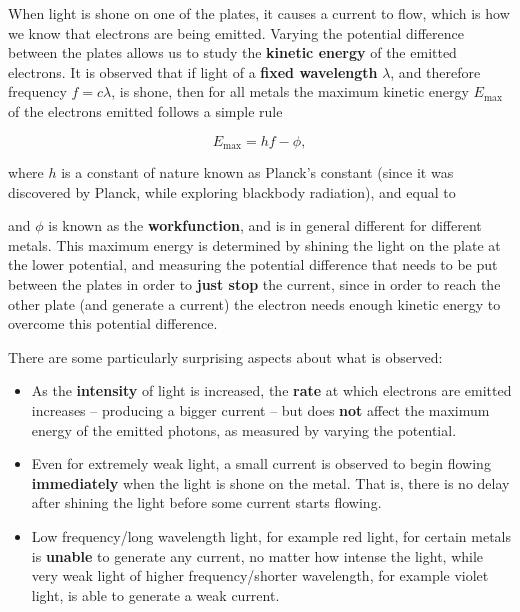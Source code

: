 \documentclass[9pt,Preprint]{lapreprint}
\begin{document}
When light is shone on one of the plates, it causes a current to flow, which is how we know that electrons are being emitted. Varying the potential difference between the plates allows us to study the \textbf{kinetic energy} of the emitted electrons. It is observed that if light of a \textbf{fixed wavelength} $\lambda$, and therefore frequency $f = c\lambda$, is shone, then for all metals the maximum kinetic energy $E_\mathrm{max}$ of the electrons emitted follows a simple rule

\begin{equation}
E_\mathrm{max} = h f - \phi,
\end{equation}

where $h$ is a constant of nature known as Planck's constant (since it was discovered by Planck, while exploring blackbody radiation), and equal to

and $\phi$ is known as the \textbf{workfunction}, and is in general different for different metals. This maximum energy is determined by shining the light on the plate at the lower potential, and measuring the potential difference that needs to be put between the plates in order to \textbf{just stop} the current, since in order to reach the other plate (and generate a current) the electron needs enough kinetic energy to overcome this potential difference.

There are some particularly surprising aspects about what is observed:

\begin{itemize}
\item As the \textbf{intensity} of light is increased, the \textbf{rate} at which electrons are emitted increases -- producing a bigger current -- but does \textbf{not} affect the maximum energy of the emitted photons, as measured by varying the potential.
\item Even for extremely weak light, a small current is observed to begin flowing \textbf{immediately} when the light is shone on the metal. That is, there is no delay after shining the light before some current starts flowing.
\item Low frequency/long wavelength light, for example red light, for certain metals is \textbf{unable} to generate any current, no matter how intense the light, while very weak light of higher frequency/shorter wavelength, for example violet light, is able to generate a weak current.
\end{itemize}
\end{document}

